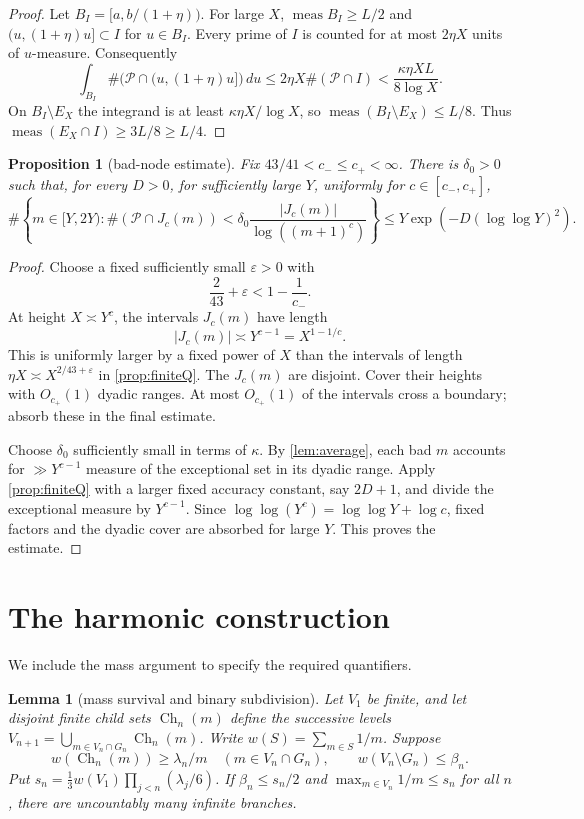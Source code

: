 \documentclass[11pt,a4paper]{article}
\newtheorem{proposition}[theorem]{Proposition}
\newtheorem{lemma}[theorem]{Lemma}
\theoremstyle{remark}
\newcommand{\PP}{\mathcal P}
\newcommand{\meas}{\operatorname{meas}}
\newcommand{\eps}{\varepsilon}
\newcommand{\Ch}{\operatorname{Ch}}
\begin{document}
\begin{proof}
Let $B_I=[a,b/(1+\eta))$.
For large $X$, $\meas B_I\ge L/2$ and
$(u,(1+\eta)u]\subset I$ for $u\in B_I$.
Every prime of $I$ is counted for at most $2\eta X$ units of $u$-measure.
Consequently
\[
 \int_{B_I}\#\bigl(\PP\cap(u,(1+\eta)u]\bigr)\,du
 \le2\eta X\#(\PP\cap I)<\frac{\kappa\eta XL}{8\log X}.
\]
On $B_I\setminus E_X$ the integrand is at least
$\kappa\eta X/\log X$, so
$\meas(B_I\setminus E_X)\le L/8$.
Thus $\meas(E_X\cap I)\ge3L/8\ge L/4$.
\end{proof}

\begin{proposition}[bad-node estimate]\label{prop:bad}
Fix $43/41<c_-\le c_+<\infty$.
There is $\delta_0>0$ such that, for every $D>0$, for sufficiently
large $Y$, uniformly for $c\in[c_-,c_+]$,
\[
 \#\left\{m\in[Y,2Y):
 \#(\PP\cap J_c(m))<
     \delta_0\frac{|J_c(m)|}{\log((m+1)^c)}\right\}
 \le Y\exp(-D(\log\log Y)^2).
\]
\end{proposition}

\begin{proof}
Choose a fixed sufficiently small $\eps>0$ with
\[
            \frac2{43}+\eps<1-\frac1{c_-}.
\]
At height $X\asymp Y^c$, the intervals $J_c(m)$ have length
\[
            |J_c(m)|\asymp Y^{c-1}=X^{1-1/c}.
\]
This is uniformly larger by a fixed power of $X$ than the intervals
of length $\eta X\asymp X^{2/43+\eps}$ in \cref{prop:finiteQ}.
The $J_c(m)$ are disjoint.
Cover their heights with $O_{c_+}(1)$ dyadic ranges.
At most $O_{c_+}(1)$ of the intervals cross a boundary; absorb these
in the final estimate.

Choose $\delta_0$ sufficiently small in terms of $\kappa$.
By \cref{lem:average}, each bad $m$ accounts for
$\gg Y^{c-1}$ measure of the exceptional set in its dyadic range.
Apply \cref{prop:finiteQ} with a larger fixed accuracy constant, say
$2D+1$, and divide the exceptional measure by $Y^{c-1}$.
Since
$\log\log(Y^c)=\log\log Y+\log c$, fixed factors and the dyadic cover
are absorbed for large $Y$. This proves the estimate.
\end{proof}

\section{The harmonic construction}

We include the mass argument to specify the required quantifiers.

\begin{lemma}[mass survival and binary subdivision]\label{lem:mass}
Let $V_1$ be finite, and let disjoint finite child sets $\Ch_n(m)$
define the successive levels
$V_{n+1}=\bigcup_{m\in V_n\cap G_n}\Ch_n(m)$.
Write $w(S)=\sum_{m\in S}1/m$.
Suppose
\[
 w(\Ch_n(m))\ge\lambda_n/m\quad(m\in V_n\cap G_n),
 \qquad w(V_n\setminus G_n)\le\beta_n.
\]
Put $s_n=\frac13w(V_1)\prod_{j<n}(\lambda_j/6)$.
If $\beta_n\le s_n/2$ and $\max_{m\in V_n}1/m\le s_n$ for all $n$,
there are uncountably many infinite branches.
\end{lemma}
\end{document}
